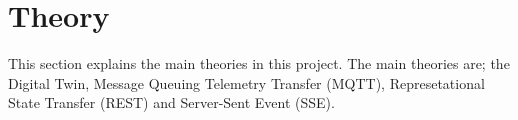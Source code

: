 \section{Theory} \label{sec:theory}
This section explains the main theories in this project. The main theories are; the Digital Twin, Message Queuing Telemetry Transfer (MQTT), Represetational State Transfer (REST) and Server-Sent Event (SSE).  







